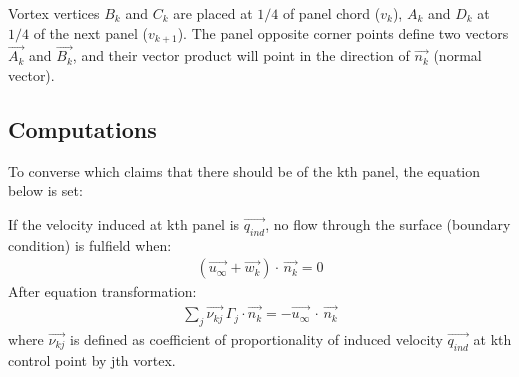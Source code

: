 \documentclass[letterpaper,10pt,english]{jupyterBook}
\begin{document}
\sphinxAtStartPar
Vortex vertices \(B_k\) and \(C_k\) are placed at \(1/4\) of panel chord (\(v_{k}\)), \(A_k\) and \(D_k\) at \(1/4\) of the next panel (\(v_{k+1}\)). The panel opposite corner points define two vectors \(\overrightarrow{A_k}\) and \(\overrightarrow{B_k}\), and their vector product will point in the direction of \(\overrightarrow{n_k}\) (normal vector).


\subsection{Computations}
\label{\detokenize{chapters/description/theory:computations}}
\sphinxAtStartPar
To converse  which claims that there should be  of the k\sphinxhyphen{}th panel, the equation below is set:

\sphinxAtStartPar
If the velocity induced at k\sphinxhyphen{}th panel is \(\overrightarrow{q_{ind}}\), no flow through the surface (boundary condition) is fulfield when:
\begin{equation}\label{equation:chapters/description/theory:bc}
\begin{split}
(\overrightarrow{u_{\infty}} + \overrightarrow{w_k})\cdot\,\overrightarrow{n_k}=0
\end{split}
\end{equation}
\sphinxAtStartPar
After equation transformation:
\begin{equation}\label{equation:chapters/description/theory:bc2}
\begin{split}
\sum_{j} \overrightarrow{\nu_{kj}}  \, \Gamma_{j} \cdot \overrightarrow{n_k}=-\overrightarrow{u_{\infty}}\,\cdot\,\overrightarrow{n_k}
\end{split}
\end{equation}
\sphinxAtStartPar
where \(\overrightarrow{\nu_{kj}}\) is defined as coefficient of proportionality of induced velocity \(\overrightarrow{q_{ind}}\) at k\sphinxhyphen{}th control point by j\sphinxhyphen{}th vortex.
\end{document}
